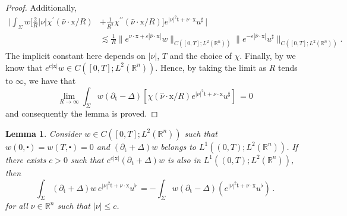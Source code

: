 \documentclass[10pt,a4paper]{amsart}
\newtheorem{lemma}[proposition]{Lemma}
\theoremstyle{remark}
\theoremstyle{definition}
\newcommand{\R}{\mathbb{R}}
\newcommand{\tm}{\mathrm{t}}
\newcommand{\x}{\mathrm{x}}
\begin{document}
\begin{proof}
Additionally,
\begin{align*}
\Big| \int_{\Sigma} w \Big[\frac{2}{R} |\nu| \chi^\prime (\hat \nu \cdot \x/R)& + \frac{1}{R^2} \chi^{\prime \prime} (\hat \nu \cdot \x/R) \Big] e^{|\nu|^2 \tm + \nu \cdot \x} u^\sharp \, \Big|\\
& \lesssim \frac{1}{R} \| e^{\nu \cdot \x + \varepsilon |\hat \nu \cdot \x|} w \|_{C([0, T] ; L^{2}(\mathbb{R}^{n}))}  \| e^{-\varepsilon |\hat \nu \cdot \x|} u^\sharp \|_{C([0, T] ; L^{2}(\mathbb{R}^{n}))}.
\end{align*}
The implicit constant here depends on $|\nu|$, $T$ and the choice of $\chi$. Finally,
by  we know that $e^{c|\x|} w \in C([0, T] ; L^{2}(\mathbb{R}^{n}))$.
Hence, by taking the limit as $R$ tends to $\infty$, we have that
\[ \lim_{R\to \infty} \int_{\Sigma} w (\partial_{\tm}-\Delta) [\chi(\hat \nu \cdot \x/R) e^{|\nu|^2 \tm + \nu \cdot \x} u^\sharp] \, = 0 \]
and consequently the lemma is proved.

\end{proof}

\begin{lemma}\label{lem:uflat}\sl
Consider $w \in C([0, T] ; L^{2}(\mathbb{R}^{n}))$ such that 
$w (0, \centerdot) = w(T, \centerdot)=0$ 
and $(\partial_{\tm}+\Delta)w $ belongs to $ L^{1}((0, T) ; L^{2}(\mathbb{R}^{n}))$.
If there exists $c > 0$ such that 
$e^{c|\x|} (\partial_{\tm}+\Delta)w $ is also in $ L^{1}((0, T) ; L^{2}(\mathbb{R}^{n}))$, then
\[\int_{\Sigma}(\partial_{\tm}+\Delta) w \, e^{|\nu|^2 \tm + \nu \cdot \x} u^\flat \, = - \int_{\Sigma} w ( \partial_{\tm}-\Delta) (e^{|\nu|^2 \tm + \nu \cdot \x} u^\flat) \, .\]
for all $\nu \in \R^n$ such that $|\nu| \leq c$.
\end{lemma}
\end{document}
